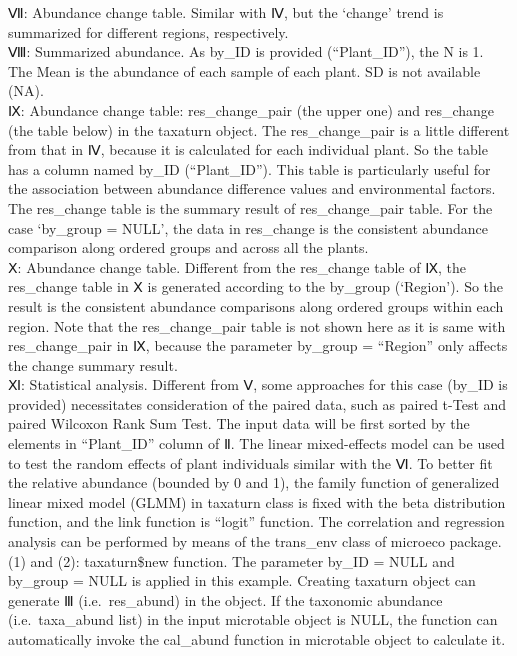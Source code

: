 \documentclass[
]{book}
\begin{document}
Ⅶ: Abundance change table. Similar with Ⅳ, but the `change' trend is summarized for different regions, respectively.\\
Ⅷ: Summarized abundance. As by\_ID is provided (``Plant\_ID''), the N is 1. The Mean is the abundance of each sample of each plant. SD is not available (NA).\\
Ⅸ: Abundance change table: res\_change\_pair (the upper one) and res\_change (the table below) in the taxaturn object.
The res\_change\_pair is a little different from that in Ⅳ, because it is calculated for each individual plant.
So the table has a column named by\_ID (``Plant\_ID'').
This table is particularly useful for the association between abundance difference values and environmental factors.
The res\_change table is the summary result of res\_change\_pair table.
For the case `by\_group = NULL', the data in res\_change is the consistent abundance comparison along ordered groups and across all the plants.\\
Ⅹ: Abundance change table.
Different from the res\_change table of Ⅸ, the res\_change table in Ⅹ is generated according to the by\_group (`Region').
So the result is the consistent abundance comparisons along ordered groups within each region.
Note that the res\_change\_pair table is not shown here as it is same with res\_change\_pair in Ⅸ,
because the parameter by\_group = ``Region'' only affects the change summary result.\\
Ⅺ: Statistical analysis. Different from Ⅴ, some approaches for this case (by\_ID is provided) necessitates consideration of the paired data,
such as paired t-Test and paired Wilcoxon Rank Sum Test. The input data will be first sorted by the elements in ``Plant\_ID'' column of Ⅱ.
The linear mixed-effects model can be used to test the random effects of plant individuals similar with the Ⅵ.
To better fit the relative abundance (bounded by 0 and 1),
the family function of generalized linear mixed model (GLMM) in taxaturn class is fixed with the beta distribution function, and the link function is ``logit'' function.
The correlation and regression analysis can be performed by means of the trans\_env class of microeco package.\\
(1) and (2): taxaturn\$new function. The parameter by\_ID = NULL and by\_group = NULL is applied in this example.
Creating taxaturn object can generate Ⅲ (i.e.~res\_abund) in the object.
If the taxonomic abundance (i.e.~taxa\_abund list) in the input microtable object is NULL,
the function can automatically invoke the cal\_abund function in microtable object to calculate it.\\
\end{document}
